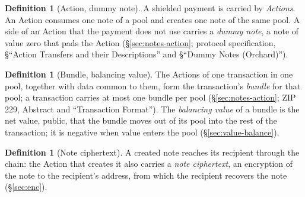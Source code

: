 \documentclass[11pt,a4paper]{article}
\theoremstyle{definition}
\newtheorem{definition}[theorem]{Definition}
\begin{document}
\begin{definition}[Action, dummy note]
A shielded payment is carried by \emph{Actions}. An Action consumes one note
of a pool and creates one note of the same pool. A side of an Action that
the payment does not use carries a \emph{dummy note}, a note of value zero
that pads the Action (\S\ref{sec:notes-action}; protocol specification,
\S``Action Transfers and their Descriptions'' and \S``Dummy Notes
(Orchard)'').
\end{definition}

\begin{definition}[Bundle, balancing value]
The Actions of one transaction in one pool, together with data common to
them, form the transaction's \emph{bundle} for that pool; a transaction
carries at most one bundle per pool (\S\ref{sec:notes-action}; ZIP 229,
Abstract and ``Transaction Format''). The \emph{balancing value} of a bundle
is the net value, public, that the bundle moves out of its pool into the rest
of the transaction; it is negative when value enters the pool
(\S\ref{sec:value-balance}).
\end{definition}

\begin{definition}[Note ciphertext]
A created note reaches its recipient through the chain: the Action that
creates it also carries a \emph{note ciphertext}, an encryption of the note
to the recipient's address, from which the recipient recovers the note
(\S\ref{sec:enc}).
\end{definition}
\end{document}
